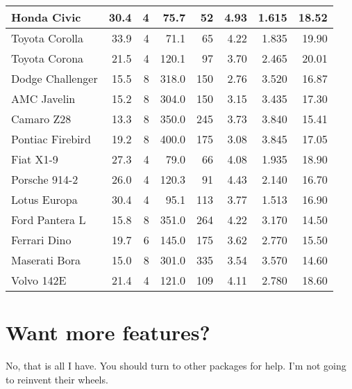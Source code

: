 \documentclass{article}\usepackage[]{graphicx}\usepackage[]{color}
\begin{document}
\begin{longtable}{lrrrrrrr}
\midrule
Honda Civic & 30.4 & 4 &  75.7 &  52 & 4.93 & 1.615 & 18.52\\
\midrule
Toyota Corolla & 33.9 & 4 &  71.1 &  65 & 4.22 & 1.835 & 19.90\\
\midrule
Toyota Corona & 21.5 & 4 & 120.1 &  97 & 3.70 & 2.465 & 20.01\\
\midrule
Dodge Challenger & 15.5 & 8 & 318.0 & 150 & 2.76 & 3.520 & 16.87\\
\midrule
AMC Javelin & 15.2 & 8 & 304.0 & 150 & 3.15 & 3.435 & 17.30\\
\midrule
Camaro Z28 & 13.3 & 8 & 350.0 & 245 & 3.73 & 3.840 & 15.41\\
\midrule
Pontiac Firebird & 19.2 & 8 & 400.0 & 175 & 3.08 & 3.845 & 17.05\\
\midrule
Fiat X1-9 & 27.3 & 4 &  79.0 &  66 & 4.08 & 1.935 & 18.90\\
\midrule
Porsche 914-2 & 26.0 & 4 & 120.3 &  91 & 4.43 & 2.140 & 16.70\\
\midrule
Lotus Europa & 30.4 & 4 &  95.1 & 113 & 3.77 & 1.513 & 16.90\\
\midrule
Ford Pantera L & 15.8 & 8 & 351.0 & 264 & 4.22 & 3.170 & 14.50\\
\midrule
Ferrari Dino & 19.7 & 6 & 145.0 & 175 & 3.62 & 2.770 & 15.50\\
\midrule
Maserati Bora & 15.0 & 8 & 301.0 & 335 & 3.54 & 3.570 & 14.60\\
\midrule
Volvo 142E & 21.4 & 4 & 121.0 & 109 & 4.11 & 2.780 & 18.60\\
\bottomrule
\end{longtable}



\section{Want more features?}

No, that is all I have. You should turn to other packages for help. I'm not
going to reinvent their wheels.
\end{document}
